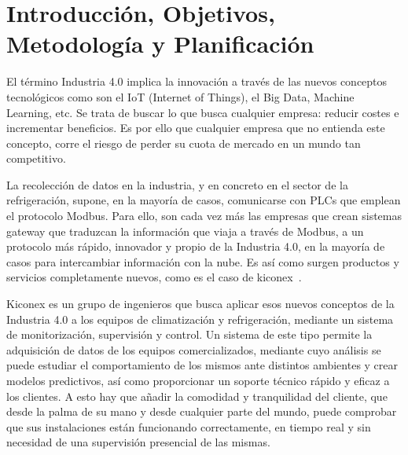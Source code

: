 
\cleardoublepage
\chapter*{Introducción, Objetivos, Metodología y Planificación}

\label{chap:intro} %




El término Industria 4.0 implica la innovación a través de las nuevos conceptos tecnológicos como son el IoT (Internet of Things), el Big Data, Machine Learning, etc. Se trata de buscar lo que busca cualquier empresa: reducir costes e incrementar beneficios. Es por ello que cualquier empresa que no entienda este concepto, corre el riesgo de perder su cuota de mercado en un mundo tan competitivo.

La recolección de datos en la industria, y en concreto en el sector de la refrigeración, supone, en la mayoría de casos, comunicarse con PLCs que emplean el protocolo Modbus. Para ello, son cada vez más las empresas que crean sistemas gateway que traduzcan la información que viaja a través de Modbus, a un protocolo más rápido, innovador y propio de la Industria 4.0, en la mayoría de casos para intercambiar información con la nube. Es así como surgen productos y servicios completamente nuevos, como es el caso de kiconex~\cite{appKiconex}.

Kiconex es un grupo de ingenieros que busca aplicar esos nuevos conceptos de la Industria 4.0 a los equipos de climatización y refrigeración, mediante un sistema de monitorización, supervisión y control. Un sistema de este tipo permite la adquisición de datos de los equipos comercializados, mediante cuyo análisis se puede estudiar el comportamiento de los mismos ante distintos ambientes y crear modelos predictivos, así como proporcionar un soporte técnico rápido y eficaz a los clientes. A esto hay que añadir la comodidad y tranquilidad del cliente, que desde la palma de su mano y desde cualquier parte del mundo, puede comprobar que sus instalaciones están funcionando correctamente, en tiempo real y sin necesidad de una supervisión presencial de las mismas.

